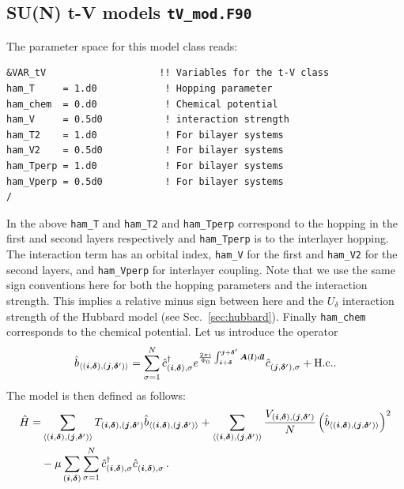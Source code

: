 \subsection{SU(N)  t-V models  \texttt{tV\_mod.F90}}


The parameter space for this model class  reads: 

\begin{lstlisting}[style=fortran,escapechar=\#,breaklines=true]
&VAR_tV                    !! Variables for the t-V class
ham_T     = 1.d0            ! Hopping parameter
ham_chem  = 0.d0            ! Chemical potential
ham_V     = 0.5d0           ! interaction strength
ham_T2    = 1.d0            ! For bilayer systems
ham_V2    = 0.5d0           ! For bilayer systems
ham_Tperp = 1.d0            ! For bilayer systems
ham_Vperp = 0.5d0           ! For bilayer systems
/

\end{lstlisting}
In the above   \texttt{ham\_T} and \texttt{ham\_T2} and \texttt{ham\_Tperp}   correspond to the hopping in the first and second layers respectively and  \texttt{ham\_Tperp}   is to the interlayer hopping.   The interaction term has an orbital index, 
\texttt{ham\_V}  for the first and  \texttt{ham\_V2}  for the second layers,  and \texttt{ham\_Vperp} for interlayer coupling. Note that we use the same sign conventions here for both the hopping parameters and the interaction strength. This implies a relative minus sign between here and the $U_\delta$ interaction strength of the Hubbard model (see Sec.~\ref{sec:hubbard}).
Finally   \texttt{ham\_chem}  corresponds to the chemical potential. Let us introduce the operator
\begin{equation}
\hat{b}_{\langle (\boldsymbol{i},\boldsymbol{\delta}), (\boldsymbol{j},\boldsymbol{\delta}') \rangle} =  \sum_{\sigma =1}^{N}    \hat{c}^{\dagger}_{(\boldsymbol{i},\boldsymbol{\delta}), \sigma }   e^{\frac{2 \pi i}{\Phi_0} \int_{\boldsymbol{i} + \boldsymbol{\delta}}^{\boldsymbol{j} + \boldsymbol{\delta}'}  
	\boldsymbol{A}(\boldsymbol{l})  d \boldsymbol{l}} \hat{c}^{}_{(\boldsymbol{j},\boldsymbol{\delta}'),\sigma} 
+ \mathrm{H.c.}.
\end{equation}
The model is then defined as follows:
\begin{align}
\hat{H}= & \sum_{\langle (\ve{i},\ve{\delta}), (\ve{j},\ve{\delta}') \rangle}   T_{(\ve{i},\ve{\delta}), (\ve{j},\ve{\delta}')}    \hat{b}_{\langle (\ve{i},\ve{\delta}), (\ve{j},\ve{\delta}') \rangle}
+ \sum_{\langle (\ve{i},\ve{\delta}), (\ve{j},\ve{\delta}') \rangle}  \frac{V_{(\ve{i},\ve{\delta}), (\ve{j},\ve{\delta}')}}{N} \left(  \hat{b}_{\langle (\ve{i},\ve{\delta}), (\ve{j},\ve{\delta}') \rangle}  \right)^2  \nonumber \\
& - \mu \sum_{(\ve{i},\ve{\delta})}  \sum_{\sigma =1}^{N} \hat{c}^{\dagger}_{(\vec{i},\ve{\delta}),\sigma } \hat{c}^{\phantom\dagger}_{(\vec{i},\ve{\delta}),\sigma } \,.
\end{align}
